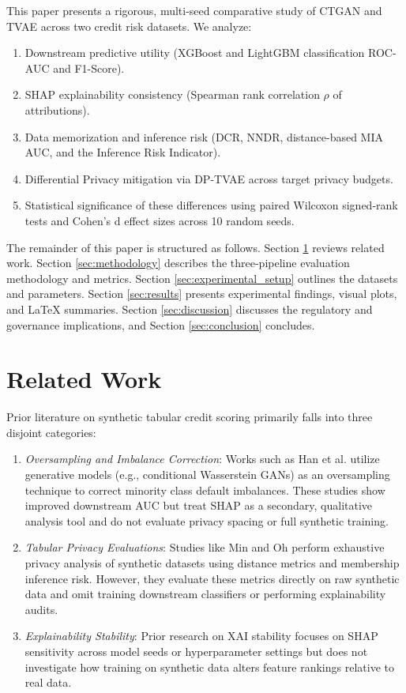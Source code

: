 \documentclass[journal]{IEEEtran}
\begin{document}
This paper presents a rigorous, multi-seed comparative study of CTGAN and TVAE across two credit risk datasets. We analyze:
\begin{enumerate}
    \item Downstream predictive utility (XGBoost and LightGBM classification ROC-AUC and F1-Score).
    \item SHAP explainability consistency (Spearman rank correlation $\rho$ of attributions).
    \item Data memorization and inference risk (DCR, NNDR, distance-based MIA AUC, and the Inference Risk Indicator).
    \item Differential Privacy mitigation via DP-TVAE across target privacy budgets.
    \item Statistical significance of these differences using paired Wilcoxon signed-rank tests and Cohen's d effect sizes across 10 random seeds.
\end{enumerate}

The remainder of this paper is structured as follows. Section \ref{sec:related_work} reviews related work. Section \ref{sec:methodology} describes the three-pipeline evaluation methodology and metrics. Section \ref{sec:experimental_setup} outlines the datasets and parameters. Section \ref{sec:results} presents experimental findings, visual plots, and LaTeX summaries. Section \ref{sec:discussion} discusses the regulatory and governance implications, and Section \ref{sec:conclusion} concludes.

\section{Related Work}
\label{sec:related_work}
Prior literature on synthetic tabular credit scoring primarily falls into three disjoint categories:
\begin{enumerate}
    \item \textit{Oversampling and Imbalance Correction}: Works such as Han et al. \cite{han2024non} utilize generative models (e.g., conditional Wasserstein GANs) as an oversampling technique to correct minority class default imbalances. These studies show improved downstream AUC but treat SHAP as a secondary, qualitative analysis tool and do not evaluate privacy spacing or full synthetic training.
    \item \textit{Tabular Privacy Evaluations}: Studies like Min and Oh \cite{min2025can} perform exhaustive privacy analysis of synthetic datasets using distance metrics and membership inference risk. However, they evaluate these metrics directly on raw synthetic data and omit training downstream classifiers or performing explainability audits.
    \item \textit{Explainability Stability}: Prior research on XAI stability focuses on SHAP sensitivity across model seeds or hyperparameter settings but does not investigate how training on synthetic data alters feature rankings relative to real data.
\end{enumerate}
\end{document}
